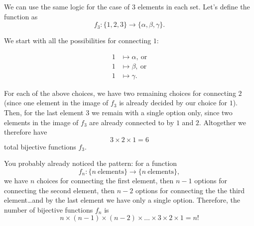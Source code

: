 \begin{enumerate}
		\vspace{2em}
		\begin{center}
		\hspace{2cm}
		\end{center}

	We can use the same logic for the case of $3$ elements in each set. Let's define the function as
	\[
		f_{3}:\{1,2,3\}\to\{\alpha,\beta,\gamma\}.
	\]

	We start with all the possibilities for connecting $1$:

	\begin{align*}
		1&\mapsto\alpha,\ \text{or}\\
		1&\mapsto\beta,\ \text{or}\\
		1&\mapsto\gamma.
	\end{align*}

	For each of the above choices, we have two remaining choices for connecting $2$ (since one element in the image of $f_{3}$ is already decided by our choice for $1$). Then, for the last element $3$ we remain with a single option only, since two elements in the image of $f_{3}$ are already connected to by $1$ and $2$. Altogether we therefore have
	\[
		3\times2\times1 = 6
	\]
	total bijective functions $f_{3}$.

	You probably already noticed the pattern: for a function
	\[
		f_{n}:\{n\ \text{elements}\} \to \{n\ \text{elements}\},
	\]
	we have $n$ choices for connecting the first element, then $n-1$ options for connecting the second element, then $n-2$ options for connecting the the third element\ldots and by the last element we have only a single option. Therefore, the number of bijective functions $f_{n}$ is
	\[
		n\times(n-1)\times(n-2)\times\dots\times3\times2\times1 = n!
	\]


\end{enumerate}
